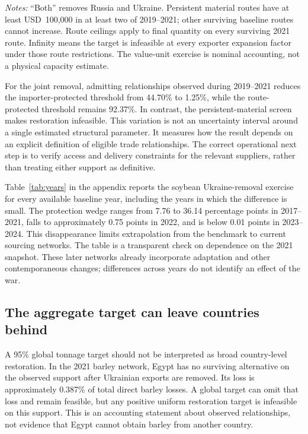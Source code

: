 \documentclass[11pt,a4paper]{article}
\begin{document}
\begin{table}[htbp]\centering\scriptsize
\caption{Soybean sensitivity: required growth for 95\% aggregate restoration (percent)}\label{tab:robust}

\begin{minipage}{\textwidth}\footnotesize\textit{Notes:} ``Both'' removes Russia and Ukraine. Persistent material routes have at least USD~100,000 in at least two of 2019--2021; other surviving baseline routes cannot increase. Route ceilings apply to final quantity on every surviving 2021 route. Infinity means the target is infeasible at every exporter expansion factor under those route restrictions. The value-unit exercise is nominal accounting, not a physical capacity estimate.\end{minipage}
\end{table}

For the joint removal, admitting relationships observed during 2019--2021 reduces the importer-protected threshold from 44.70\% to 1.25\%, while the route-protected threshold remains 92.37\%. In contrast, the persistent-material screen makes restoration infeasible. This variation is not an uncertainty interval around a single estimated structural parameter. It measures how the result depends on an explicit definition of eligible trade relationships. The correct operational next step is to verify access and delivery constraints for the relevant suppliers, rather than treating either support as definitive.

Table~\ref{tab:years} in the appendix reports the soybean Ukraine-removal exercise for every available baseline year, including the years in which the difference is small. The protection wedge ranges from 7.76 to 36.14 percentage points in 2017--2021, falls to approximately 0.75 points in 2022, and is below 0.01 points in 2023--2024. This disappearance limits extrapolation from the benchmark to current sourcing networks. The table is a transparent check on dependence on the 2021 snapshot. These later networks already incorporate adaptation and other contemporaneous changes; differences across years do not identify an effect of the war.

\subsection{The aggregate target can leave countries behind}
A 95\% global tonnage target should not be interpreted as broad country-level restoration. In the 2021 barley network, Egypt has no surviving alternative on the observed support after Ukrainian exports are removed. Its loss is approximately 0.387\% of total direct barley losses. A global target can omit that loss and remain feasible, but any positive uniform restoration target is infeasible on this support. This is an accounting statement about observed relationships, not evidence that Egypt cannot obtain barley from another country.
\end{document}
